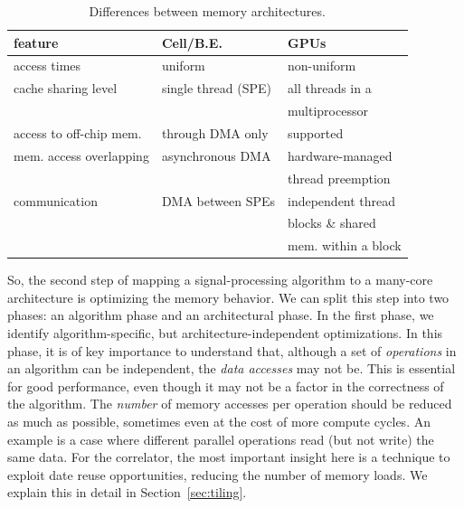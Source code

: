 \documentclass{article}
\begin{document}
\begin{table}[t]
\begin{center}
{\footnotesize
\begin{tabular}{|l|l|l|}
\hline
feature                   & Cell/B.E.                      & GPUs \\
\hline
access times              & uniform                        & non-uniform \\
\hline
cache sharing level       & single thread (SPE)            & all threads in a \\
                          &                                & multiprocessor \\
\hline
access to off-chip mem.   & through DMA only               & supported \\
\hline
mem. access overlapping   & asynchronous DMA               & hardware-managed \\
                          &                                & thread preemption \\
\hline
communication             & DMA between SPEs               & independent thread  \\
                          &                                & blocks \& shared   \\
                          &                                & mem. within a block \\
\hline
\end{tabular}
} %
\end{center}
\vspace{-0.5cm}
\caption{Differences between memory architectures.}
\label{memory-properties}
\end{table}

So, the second step of mapping a signal-processing algorithm to a many-core architecture
is optimizing the memory behavior. We can split this step into two phases:
an algorithm phase and an architectural phase.
In the first phase, we identify algorithm-specific, but
architecture-independent optimizations. 
In this phase, it is of key importance to understand that, although a
set of \emph{operations} in an algorithm can be independent, the \emph{data
  accesses} may not be.  This is essential for good performance, even though it may not be a
factor in the correctness of the algorithm. The \emph{number} of memory accesses per operation should
be reduced as much as possible, sometimes even at the cost of more
compute cycles. An example is a case
where different parallel operations read (but not write) the
same data.  For the correlator, the most important insight here
is a technique to exploit date reuse opportunities, reducing the number of memory
loads. We explain this in detail in Section~\ref{sec:tiling}.
\end{document}
